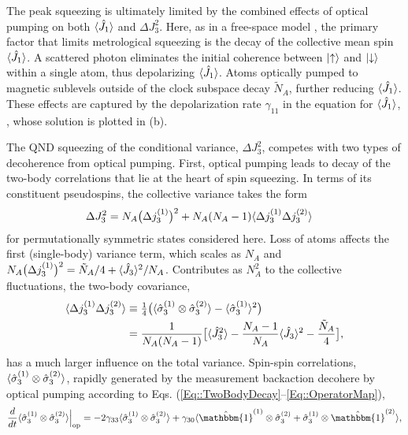 \documentclass[aps,pra,twocolumn]{revtex4-1} %
\newcommand{\varz}{\Delta J_3^2}
\newcommand{\jx}{\hat{J}_1}
\newcommand{\NA}{\tilde{N}_A}
\begin{document}
The peak squeezing is ultimately limited by the combined effects of optical pumping on both $\expt{\jx}$ and $\varz$.  Here, as in a free-space model \cite{baragiola_three-dimensional_2014}, the primary factor that limits metrological squeezing is the decay of the collective mean spin $\expt{\jx}$. 
A scattered photon eliminates the initial coherence between $\lvert{\uparrow}\rangle$ and $\lvert{\downarrow}\rangle$ within a single atom, thus depolarizing $\expt{\jx}$.  
Atoms optically pumped to magnetic sublevels outside of the clock subspace decay $\NA$, further reducing $\expt{\jx}$. 
These effects are captured by the depolarization rate $\gamma_{11}$ in the equation for $\expt{\jx}$, , whose solution is plotted in (b).

The QND squeezing of the conditional variance, $\varz$, competes with two types of decoherence from optical pumping.
First, optical pumping leads to decay of the two-body correlations that lie at the heart of spin squeezing.  
In terms of its constituent pseudospins, the collective variance takes the form
	\begin{align}
		\varz & = N_A \big( \Delta j_3^{(1)} \big)^2 + N_A(N_A-1) \expt{ \Delta j_3^{(1)} \Delta j_3^{(2)} }
	\end{align}
for permutationally symmetric states considered here. 
Loss of atoms affects the first (single-body) variance term, which scales as $N_A$ and $ N_A \big( \Delta j_3^{(1)} \big)^2=\NA/4+\expt{\hat{J}_3}^2/N_A $. 
Contributes as $N_A^2$ to the collective fluctuations, the two-body covariance,
	\begin{align}
		\expt{ \Delta j_3^{(1)} \Delta j_3^{(2)} } &\equiv \smallfrac{1}{4} \big( \expt{ \hat{\sigma}_3^{(1)} \otimes \hat{\sigma}_3^{(2)}  } - \expt{\hat{\sigma}_3^{(1)} }^2  \big)\\
		&= \frac{1}{N_A(N_A-1)}\big[ \expt{\hat{J}_3^2}-\frac{N_A-1}{N_A}\expt{\hat{J}_3}^2-\frac{\NA}{4} \big],
	\end{align}
has a much larger influence on the total variance. 
Spin-spin correlations, $\langle{ \hat{\sigma}_3^{(1)} \otimes \hat{\sigma}_3^{(2)} }\rangle$, rapidly generated by the measurement backaction decohere by optical pumping according to Eqs. (\ref{Eq::TwoBodyDecay}--\ref{Eq::OperatorMap}),
	\begin{align} \label{Eq::TwoBodySpinDecay}
		\frac{d}{dt} \expt{\hat{\sigma}_3^{(1)} \otimes \hat{\sigma}_3^{(2)} }  \Big|_{\rm op} = - 2 \gamma_{33}  \expt{\hat{\sigma}_3^{(1)} \otimes \hat{\sigma}_3^{(2)}} + \gamma_{30} \expt{ \hat{\mathbbm{1}}^{(1)} \otimes \hat{\sigma}_3^{(2)} + \hat{\sigma}_3^{(1)} \otimes \hat{\mathbbm{1}}^{(2)} },
	\end{align}
\end{document}
